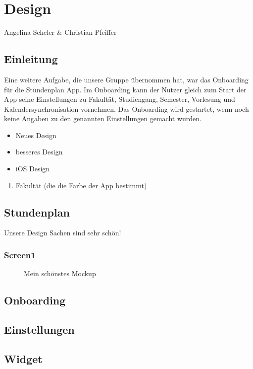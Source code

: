 \chapter{Design}
Angelina Scheler \& Christian Pfeiffer

\section{Einleitung}
Eine weitere Aufgabe, die unsere Gruppe übernommen hat, war das Onboarding für die Stundenplan App. Im Onboarding kann der Nutzer gleich zum Start der App seine Einstellungen zu Fakultät, Studiengang, Semester, Vorlesung und Kalendersynchronisation vornehmen. Das Onboarding wird gestartet, wenn noch keine Angaben zu den genannten Einstellungen gemacht wurden.

\begin{itemize}
\item Neues Design
\item besseres Design
\item iOS Design
\end{itemize}

\begin{enumerate}
\item Fakultät (die die Farbe der App bestimmt)
\end{enumerate}


\section{Stundenplan}
Unsere Design Sachen sind sehr schön!
\subsection{Screen1}

\begin{figure}[ht]
	\centering
	\caption{Mein schönstes Mockup}
	\label{fig1}
\end{figure}

\section{Onboarding}
\section{Einstellungen}
\section{Widget}

